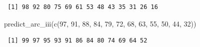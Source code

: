 \documentclass[
  letterpaper,
  DIV=11,
  numbers=noendperiod]{scrartcl}
\newenvironment{Shaded}{\begin{snugshade}}{\end{snugshade}}
\newcommand{\DecValTok}[1]{\textcolor[rgb]{0.68,0.00,0.00}{#1}}
\newcommand{\FunctionTok}[1]{\textcolor[rgb]{0.28,0.35,0.67}{#1}}
\newcommand{\NormalTok}[1]{\textcolor[rgb]{0.00,0.23,0.31}{#1}}
\begin{document}
\begin{verbatim}
 [1] 98 92 80 75 69 61 53 48 43 35 31 26 16
\end{verbatim}

\begin{Shaded}
\begin{Highlighting}[]
\FunctionTok{predict\_arc\_iii}\NormalTok{(}\FunctionTok{c}\NormalTok{(}\DecValTok{97}\NormalTok{, }\DecValTok{91}\NormalTok{, }\DecValTok{88}\NormalTok{, }\DecValTok{84}\NormalTok{, }\DecValTok{79}\NormalTok{, }\DecValTok{72}\NormalTok{, }\DecValTok{68}\NormalTok{, }\DecValTok{63}\NormalTok{, }\DecValTok{55}\NormalTok{, }\DecValTok{50}\NormalTok{, }\DecValTok{44}\NormalTok{, }\DecValTok{32}\NormalTok{))}
\end{Highlighting}
\end{Shaded}

\begin{verbatim}
 [1] 99 97 95 93 91 86 84 80 74 69 64 52
\end{verbatim}
\end{document}

